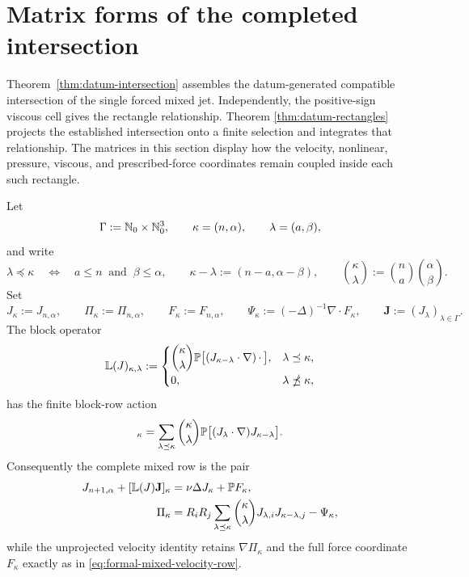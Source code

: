 \section{Matrix forms of the completed intersection}
\label{sec:matrix-forms}

Theorem~\ref{thm:datum-intersection} assembles the datum-generated compatible
intersection of the single forced mixed jet.  Independently, the positive-sign
viscous cell gives the rectangle relationship.  Theorem
\ref{thm:datum-rectangles} projects the established intersection onto a finite
selection and integrates that relationship.  The matrices in this section
display how the velocity, nonlinear, pressure, viscous, and prescribed-force
coordinates remain coupled inside each such rectangle.

\begin{proposition}
\label{prop:formal-mixed-index-matrix}
Let
\[
 \Gamma:=\mathbb N_0\times\mathbb N_0^3,
 \qquad
 \kappa=(n,\alpha),
 \qquad
 \lambda=(a,\beta),
\]
and write
\[
 \lambda\preceq\kappa
 \quad\Longleftrightarrow\quad
 a\le n\ \text{ and }\ \beta\le\alpha,
 \qquad
 \kappa-\lambda:=(n-a,\alpha-\beta),
 \qquad
 \binom\kappa\lambda:=\binom na\binom\alpha\beta.
\]
Set
\[
 J_\kappa:=J_{n,\alpha},
 \qquad
 \Pi_\kappa:=\Pi_{n,\alpha},
 \qquad
 F_\kappa:=F_{n,\alpha},
 \qquad
 \Psi_\kappa:=(-\Delta)^{-1}\nabla\cdot F_\kappa,
 \qquad
 \mathbf J:=(J_\lambda)_{\lambda\in\Gamma}.
\]
The block operator
\begin{equation}
 \mathbb L(J)_{\kappa,\lambda}
 :=
 \begin{cases}
 \displaystyle
 \binom\kappa\lambda
 \mathbb P\bigl[(J_{\kappa-\lambda}\cdot\nabla)\,\mathord\cdot\,\bigr],
 &\lambda\preceq\kappa,\\[6pt]
 0,&\lambda\npreceq\kappa,
 \end{cases}
 \label{eq:formal-mixed-transport-matrix}
\end{equation}
has the finite block-row action
\begin{equation}
 [\mathbb L(J)\mathbf J]_\kappa
 =\sum_{\lambda\preceq\kappa}\binom\kappa\lambda
   \Pp\bigl[(J_\lambda\cdot\nabla)J_{\kappa-\lambda}\bigr].
 \label{eq:formal-mixed-transport-row}
\end{equation}
Consequently the complete mixed row is the pair
\begin{align}
 J_{n+1,\alpha}+[\mathbb L(J)\mathbf J]_\kappa
 &=\nu\Delta J_\kappa+\mathbb P F_\kappa,
 \label{eq:formal-mixed-projected-matrix-row}\\
 \Pi_\kappa
 &=R_iR_j\sum_{\lambda\preceq\kappa}\binom\kappa\lambda
   J_{\lambda,i}J_{\kappa-\lambda,j}-\Psi_\kappa,
 \label{eq:formal-mixed-matrix-pressure-row}
\end{align}
while the unprojected velocity identity retains
\(\nabla\Pi_\kappa\) and the full force coordinate \(F_\kappa\) exactly as in
\eqref{eq:formal-mixed-velocity-row}.


\end{proposition}
